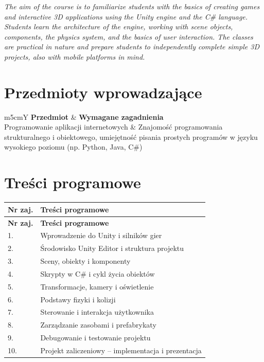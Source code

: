 \documentclass[12pt, a4paper]{article}
\newcommand{\thdrule}{\noalign{\global\setlength{\extrarowheight}{0pt}}}
\newcommand{\thdend}{\noalign{\global\setlength{\extrarowheight}{3pt}}}
\begin{document}
\textit{The aim of the course is to familiarize students with the basics of creating games and interactive 3D applications using the Unity engine and the C\# language. Students learn the architecture of the engine, working with scene objects, components, the physics system, and the basics of user interaction. The classes are practical in nature and prepare students to independently complete simple 3D projects, also with mobile platforms in mind.}


\section{Przedmioty wprowadzające}

{\scriptsize
\begin{tabularx}{\textwidth}{m{5cm}Y}
\thdrule\toprule
{} {\color{white}\textbf{Przedmiot}} & {\color{white}\textbf{Wymagane zagadnienia}} \\
\midrule\thdend
   Programowanie aplikacji internetowych & Znajomość programowania strukturalnego i obiektowego, umiejętność pisania prostych programów w języku wysokiego poziomu (np. Python, Java, C\#) \\
\bottomrule
\end{tabularx}}

\section{Treści programowe}

{\scriptsize
\begin{longtable}{m{1.5cm}m{14.5cm}}
\thdrule\toprule
\rowcolor{pjatkRed} {\color{white}\textbf{Nr zaj.}} & {\color{white}\textbf{Treści programowe}} \\
\midrule\thdend
\endfirsthead
\thdrule\toprule
\rowcolor{pjatkRed} {\color{white}\textbf{Nr zaj.}} & {\color{white}\textbf{Treści programowe}} \\
\midrule\thdend
\endhead
  \rowcolor{tableRowLight} 1. & Wprowadzenie do Unity i silników gier \\
  \rowcolor{tableRowAlt} 2. & Środowisko Unity Editor i struktura projektu \\
  \rowcolor{tableRowLight} 3. & Sceny, obiekty i komponenty \\
  \rowcolor{tableRowAlt} 4. & Skrypty w C\# i cykl życia obiektów \\
  \rowcolor{tableRowLight} 5. & Transformacje, kamery i oświetlenie \\
  \rowcolor{tableRowAlt} 6. & Podstawy fizyki i kolizji \\
  \rowcolor{tableRowLight} 7. & Sterowanie i interakcja użytkownika \\
  \rowcolor{tableRowAlt} 8. & Zarządzanie zasobami i prefabrykaty \\
  \rowcolor{tableRowLight} 9. & Debugowanie i testowanie projektu \\
  \rowcolor{tableRowAlt} 10. & Projekt zaliczeniowy – implementacja i prezentacja \\
\bottomrule
\end{longtable}}
\end{document}
